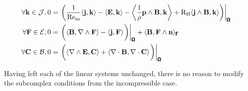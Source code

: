 \begin{align}
\begin{split}
        \end{split}  \\
        \forall \bfk \in \calJ,  0  &=  \left.\left(\frac{1}{\rmRem}\langle\bfj, \bfk\rangle - \langle\bfE, \bfk\rangle - \left\langle\frac{1}{\rho}\bfp\wedge\bfB, \bfk\right\rangle + \rmRH\langle\bfj\wedge\bfB, \bfk\rangle\right)\right|_{\bfOmega}  \\
        \forall \bfF \in \calE,  0  &=  \left.\left(\langle\bfB, \nabla\wedge\bfF\rangle - \langle\bfj, \bfF\rangle\tall\right)\right|_{\bfOmega} + \langle\bfB, \bfF\wedge\bfn\rangle_{\bfGamma}  \\
        \forall \bfC \in \calB,  0  &=  \left.\left(\langle\nabla\wedge\bfE, \bfC\rangle + \langle\nabla\cdot\bfB, \nabla\cdot\bfC\rangle\tall\right)\right|_{\bfOmega}
    \end{align}    
    
    \line
    
     Having left each of the linear systems unchanged, there is no reason to modify the subcomplex conditions from the incompressible case.

